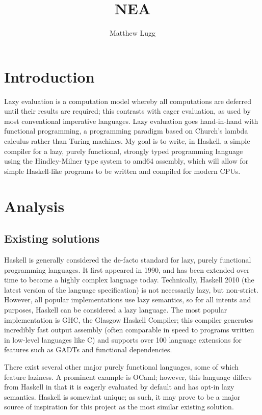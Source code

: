 \documentclass[9pt]{extarticle}
\title{NEA}
\author{Matthew Lugg}
\begin{document}
\maketitle

\newpage

\tableofcontents

\newpage

\section{Introduction}

Lazy evaluation is a computation model whereby all computations are deferred
until their results are required; this contrasts with eager evaluation, as used
by most conventional imperative languages. Lazy evaluation goes hand-in-hand
with functional programming, a programming paradigm based on Church's lambda
calculus rather than Turing machines. My goal is to write, in Haskell, a simple
compiler for a lazy, purely functional, strongly typed programming language
using the Hindley-Milner type system to amd64 assembly, which will allow for
simple Haskell-like programs to be written and compiled for modern CPUs.

\section{Analysis}

\subsection{Existing solutions}

Haskell is generally considered the de-facto standard for lazy, purely
functional programming languages. It first appeared in 1990, and has been
extended over time to become a highly complex language today. Technically,
Haskell 2010 (the latest version of the language specification) is not
necessarily lazy, but non-strict. However, all popular implementations use lazy
semantics, so for all intents and purposes, Haskell can be considered a lazy
language. The most popular implementation is GHC, the Glasgow Haskell Compiler;
this compiler generates incredibly fast output assembly (often comparable in
speed to programs written in low-level languages like C) and supports over 100
language extensions for features such as GADTs and functional dependencies. 

There exist several other major purely functional languages, some of which
feature laziness. A prominent example is OCaml; however, this language differs
from Haskell in that it is eagerly evaluated by default and has opt-in lazy
semantics. Haskell is somewhat unique; as such, it may prove to be a major
source of inspiration for this project as the most similar existing solution. 
\end{document}
